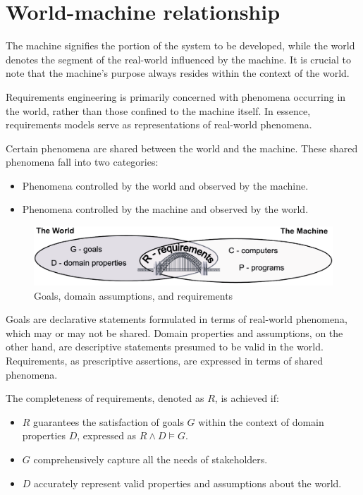 \section{World-machine relationship}

The machine signifies the portion of the system to be developed, while the world denotes the segment of the real-world influenced by the machine. 
It is crucial to note that the machine's purpose always resides within the context of the world.

Requirements engineering is primarily concerned with phenomena occurring in the world, rather than those confined to the machine itself. 
In essence, requirements models serve as representations of real-world phenomena.
 
Certain phenomena are shared between the world and the machine. 
These shared phenomena fall into two categories:
\begin{itemize}
    \item Phenomena controlled by the world and observed by the machine.
    \item Phenomena controlled by the machine and observed by the world.
\end{itemize}
\begin{figure}[H]
    \centering
    \includegraphics[width=0.75\linewidth]{images/worldmachine.png}
    \caption{Goals, domain assumptions, and requirements}
\end{figure}
Goals are declarative statements formulated in terms of real-world phenomena, which may or may not be shared.
Domain properties and assumptions, on the other hand, are descriptive statements presumed to be valid in the world. 
Requirements, as prescriptive assertions, are expressed in terms of shared phenomena.
  
The completeness of requirements, denoted as $R$, is achieved if:
\begin{itemize}
    \item $R$ guarantees the satisfaction of goals $G$ within the context of domain properties $D$, expressed as $R\land D \models G$.
    \item $G$ comprehensively capture all the needs of stakeholders.
    \item $D$ accurately represent valid properties and assumptions about the world.
\end{itemize}